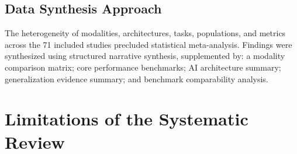 \documentclass[11pt,a4paper]{article}
\begin{document}
\subsection{Data Synthesis Approach}

The heterogeneity of modalities, architectures, tasks, populations, and metrics across the 71 included studies precluded statistical meta-analysis. Findings were synthesized using structured narrative synthesis, supplemented by: a modality comparison matrix; core performance benchmarks; AI architecture summary; generalization evidence summary; and benchmark comparability analysis.













\section{Limitations of the Systematic Review}
\end{document}
